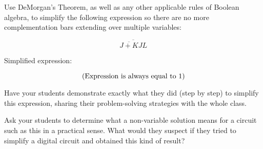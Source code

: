 

Use DeMorgan's Theorem, as well as any other applicable rules of Boolean algebra, to simplify the following expression so there are no more complementation bars extending over multiple variables:

$$\overline{ \overline{J + K} JL }$$







Simplified expression:

$$\hbox{(Expression is always equal to 1)}$$







Have your students demonstrate exactly what they did (step by step) to simplify this expression, sharing their problem-solving strategies with the whole class.

Ask your students to determine what a non-variable solution means for a circuit such as this in a practical sense.  What would they suspect if they tried to simplify a digital circuit and obtained this kind of result?




